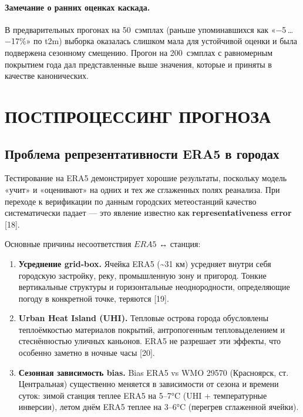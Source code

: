 \documentclass[14pt,a4paper]{extarticle}
\numberwithin{table}{section}
\numberwithin{figure}{section}
\numberwithin{equation}{section}
\providecommand{\tightlist}{%
  \setlength{\itemsep}{0pt}\setlength{\parskip}{0pt}}
\begin{document}
\paragraph{Замечание о ранних оценках каскада.} В предварительных прогонах
на 50~сэмплах (раньше упоминавшихся как «−5\,\dots\,−17\%» по t2m)
выборка оказалась слишком мала для устойчивой оценки и была подвержена
сезонному смещению. Прогон на 200~сэмплах с равномерным покрытием
года дал представленные выше значения, которые и приняты в качестве
канонических.


\newpage

\section{ПОСТПРОЦЕССИНГ ПРОГНОЗА}\label{ux43fux43eux441ux442ux43fux440ux43eux446ux435ux441ux441ux438ux43dux433-ux43fux440ux43eux433ux43dux43eux437ux430}

\subsection{Проблема репрезентативности ERA5 в городах}\label{ux43fux440ux43eux431ux43bux435ux43cux430-ux440ux435ux43fux440ux435ux437ux435ux43dux442ux430ux442ux438ux432ux43dux43eux441ux442ux438-era5-ux432-ux433ux43eux440ux43eux434ux430ux445}

Тестирование на ERA5 демонстрирует хорошие результаты, поскольку модель
«учит» и «оценивают» на одних и тех же сглаженных полях реанализа. При
переходе к верификации по данным городских метеостанций качество
систематически падает --- это явление известно как
\textbf{representativeness error} {[}18{]}.

Основные причины несоответствия \(ERA5\) ↔ станция:

\begin{enumerate}
\def\labelenumi{\arabic{enumi}.}
\tightlist
\item
  \textbf{Усреднение grid-box.} Ячейка ERA5 (\textasciitilde31 км)
  усредняет внутри себя городскую застройку, реку, промышленную зону и
  пригород. Тонкие вертикальные структуры и горизонтальные
  неоднородности, определяющие погоду в конкретной точке, теряются
  {[}19{]}.
\item
  \textbf{Urban Heat Island (UHI).} Тепловые острова города обусловлены
  теплоёмкостью материалов покрытий, антропогенным тепловыделением и
  стеснённостью уличных каньонов. ERA5 не разрешает эти эффекты, что
  особенно заметно в ночные часы {[}20{]}.
\item
  \textbf{Сезонная зависимость bias.} Bias ERA5 vs WMO 29570
  (Красноярск, ст. Центральная) существенно меняется в зависимости от
  сезона и времени суток: зимой станция теплее ERA5 на 5--7°C (UHI +
  температурные инверсии), летом днём ERA5 теплее на 3--6°C (перегрев
  сглаженной ячейки).
\end{enumerate}
\end{document}
